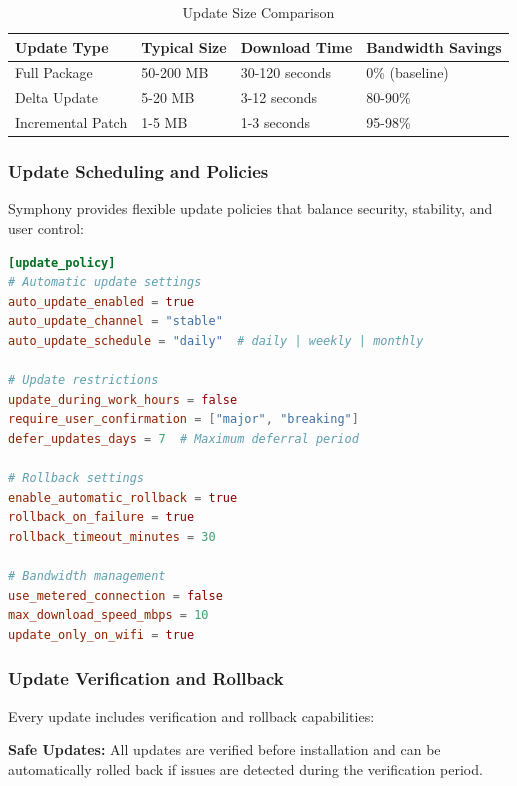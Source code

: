 \begin{table}[h]
\centering
\caption{Update Size Comparison}
\label{tab:update-size-comparison}
\begin{tabular}{@{}llll@{}}
\toprule
\textbf{Update Type} & \textbf{Typical Size} & \textbf{Download Time} & \textbf{Bandwidth Savings} \\
\midrule
Full Package & 50-200 MB & 30-120 seconds & 0\% (baseline) \\
Delta Update & 5-20 MB & 3-12 seconds & 80-90\% \\
Incremental Patch & 1-5 MB & 1-3 seconds & 95-98\% \\
\bottomrule
\end{tabular}
\end{table}

\subsubsection{Update Scheduling and Policies}
\label{subsubsec:update-scheduling-policies}

Symphony provides flexible update policies that balance security, stability, and user control:

\begin{lstlisting}[language=toml,caption=Update Policy Configuration]
[update_policy]
# Automatic update settings
auto_update_enabled = true
auto_update_channel = "stable"
auto_update_schedule = "daily"  # daily | weekly | monthly

# Update restrictions
update_during_work_hours = false
require_user_confirmation = ["major", "breaking"]
defer_updates_days = 7  # Maximum deferral period

# Rollback settings
enable_automatic_rollback = true
rollback_on_failure = true
rollback_timeout_minutes = 30

# Bandwidth management
use_metered_connection = false
max_download_speed_mbps = 10
update_only_on_wifi = true
\end{lstlisting}

\subsubsection{Update Verification and Rollback}
\label{subsubsec:update-verification-rollback}

Every update includes verification and rollback capabilities:

\begin{alertbox}
\textbf{Safe Updates:} All updates are verified before installation and can be automatically rolled back if issues are detected during the verification period.
\end{alertbox}

